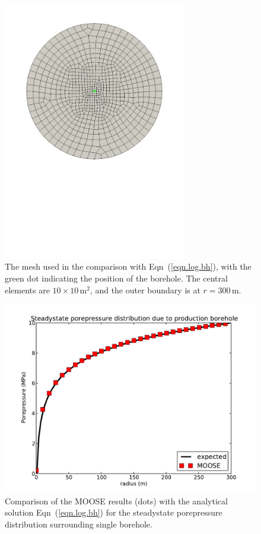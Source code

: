 \documentclass[]{scrreprt}
\begin{document}
\begin{figure}[htb]
\centering
\includegraphics[width=8cm]{bh07_mesh.pdf}
\caption{The mesh used in the comparison with Eqn~(\ref{eqn.log.bh}),
  with the green dot indicating the position of the borehole.
  The central elements are $10\times 10$\,m$^{2}$, and the outer
  boundary is at $r=300$\,m.}
\label{bh07.mesh.fig}
\end{figure}



\begin{figure}[htb]
\centering
\includegraphics[width=12cm]{bh07.pdf}
\caption{Comparison of the MOOSE results (dots) with the analytical
  solution Eqn~(\ref{eqn.log.bh}) for the steadystate porepressure
  distribution surrounding single borehole.}
\label{bh07.fig}
\end{figure}
\end{document}
